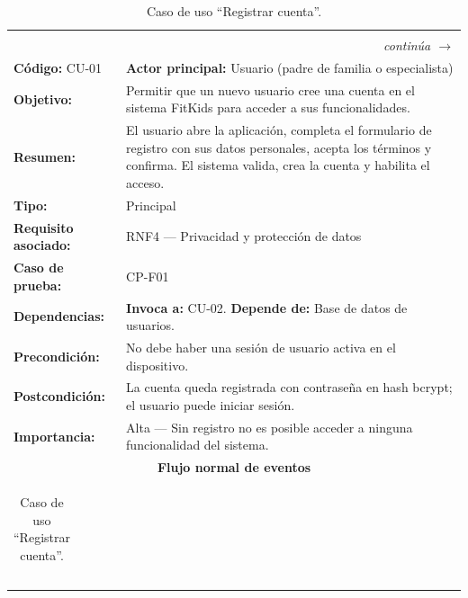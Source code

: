 				\begingroup
					\setlength{\LTpre}{6pt}\setlength{\LTpost}{6pt}
					\renewcommand{\arraystretch}{1.20}
					\footnotesize
					\begin{longtable}{p{4cm}p{10.4cm}}
						\caption{Caso de uso ``Registrar cuenta''.}\label{tab:cu01}\\
						\hline
						\rowcolor{headblue}\multicolumn{2}{c}{\textbf{\color{white}Caso de uso ``Registrar cuenta''}}\\\hline
						\endfirsthead
						\hline\rowcolor{headblue}\multicolumn{2}{c}{\textbf{\color{white}Caso de uso ``Registrar cuenta'' (continuación)}}\\\hline
						\endhead
						\hline\multicolumn{2}{r}{\footnotesize\itshape continúa $\rightarrow$}\\
						\endfoot
						\hline\endlastfoot
						\textbf{Código:} CU-01 & \textbf{Actor principal:} Usuario (padre de familia o especialista)\\
						\textbf{Objetivo:} & Permitir que un nuevo usuario cree una cuenta en el sistema FitKids para acceder a sus funcionalidades.\\
						\textbf{Resumen:} & El usuario abre la aplicación, completa el formulario de registro con sus datos personales, acepta los términos y confirma. El sistema valida, crea la cuenta y habilita el acceso.\\
						\textbf{Tipo:} & Principal\\
						\textbf{Requisito asociado:} & RNF4 --- Privacidad y protección de datos\\
						\textbf{Caso de prueba:} & CP-F01\\
						\textbf{Dependencias:} & \textbf{Invoca a:} CU-02. \textbf{Depende de:} Base de datos de usuarios.\\
						\textbf{Precondición:} & No debe haber una sesión de usuario activa en el dispositivo.\\
						\textbf{Postcondición:} & La cuenta queda registrada con contraseña en hash bcrypt; el usuario puede iniciar sesión.\\
						\textbf{Importancia:} & Alta --- Sin registro no es posible acceder a ninguna funcionalidad del sistema.\\\hline
						\multicolumn{2}{c}{\cellcolor{grpgray}\textbf{Flujo normal de eventos}}\\
						\multicolumn{2}{p{14.4cm}}{%
							\begin{tabular}{p{7.0cm}p{7.0cm}}
								\hline

\end{tabular}}
\end{longtable}
